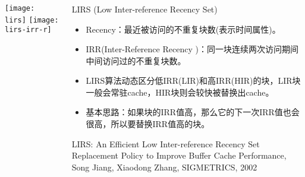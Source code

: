 %
\begin{frame}[plain]
	\frametitle{ }
	\begin{columns}
		\begin{column}{.5\textwidth}
			\centering
			\texttt{[image: lirs]}
			\texttt{[image: lirs-irr-r]}
		\end{column}
		
		\begin{column}{.5\textwidth}
			LIRS (Low Inter-reference Recency Set)\textbf{}
				
				\begin{itemize}
					\item Recency：最近被访问的不重复块数(表示时间属性)。
					\item IRR(Inter-Reference Recency )：同一块连续两次访问期间中间访问过的不重复块数。
					\item  LIRS算法动态区分低IRR(LIR)和高IRR(HIR)的块，LIR块一般会常驻cache，HIR块则会较快被替换出cache。
					\item 基本思路：如果块的IRR值高，那么它的下一次IRR值也会很高，所以要替换IRR值高的块。

					
				\end{itemize}
			\tiny LIRS: An Efficient Low Inter-reference Recency Set Replacement Policy to Improve Buffer Cache Performance, Song Jiang, Xiaodong Zhang, SIGMETRICS, 2002
			
		\end{column}
		
		
	\end{columns}
\end{frame}


